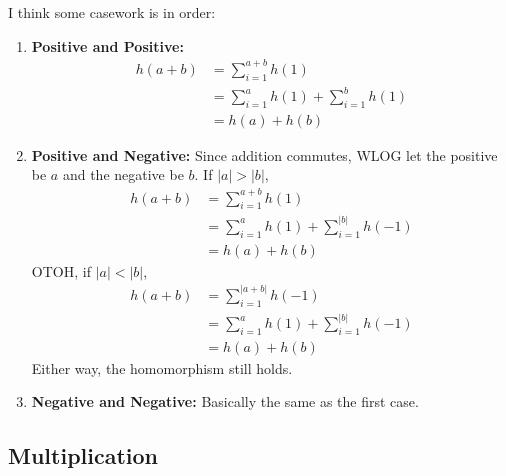 \documentclass[12pt]{article}
\begin{document}
I think some casework is in order:
\begin{enumerate}
  \item \textbf{Positive and Positive:}
        \begin{align*}
          h(a+b)
           & = \sum_{i=1}^{a+b} h(1)                     \\
           & = \sum_{i=1}^{a} h(1) + \sum_{i=1}^{b} h(1) \\
           & = h(a)+h(b)
        \end{align*}
  \item \textbf{Positive and Negative:}
        Since addition commutes, WLOG let the positive be $a$ and the negative be $b$.
        If $|a| > |b|$,
        \begin{align*}
          h(a+b)
           & = \sum_{i=1}^{a+b} h(1)                        \\
           & = \sum_{i=1}^{a} h(1) + \sum_{i=1}^{|b|} h(-1) \\
           & = h(a) + h(b)
        \end{align*}
        OTOH, if $|a| < |b|$,
        \begin{align*}
          h(a+b)
           & = \sum_{i=1}^{|a+b|} h(-1)                     \\
           & = \sum_{i=1}^{a} h(1) + \sum_{i=1}^{|b|} h(-1) \\
           & = h(a) + h(b)
        \end{align*}
        Either way, the homomorphism still holds.
  \item \textbf{Negative and Negative:} Basically the same as the first case.
\end{enumerate}

\subsection{Multiplication}
\end{document}
